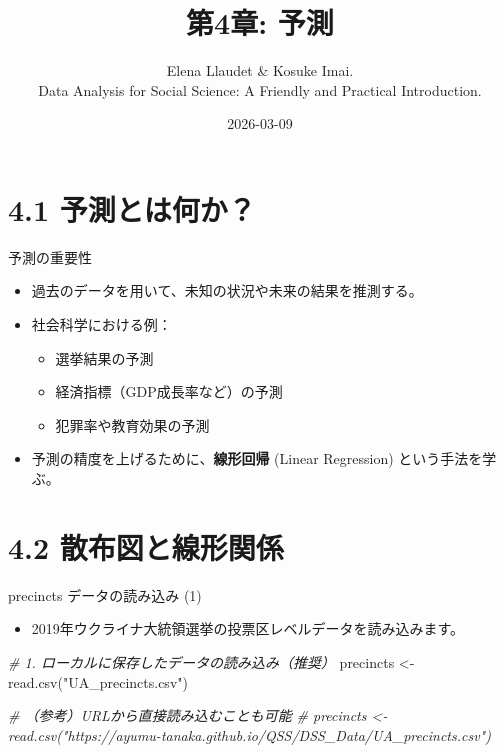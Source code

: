 \documentclass[
  ignorenonframetext,
]{beamer}
\title{第4章: 予測}
\subtitle{Elena Llaudet \& Kosuke Imai.\\
Data Analysis for Social Science: A Friendly and Practical
Introduction.}
\author{}
\date{\vspace{-2.5em}2026-03-09}
\newenvironment{Shaded}{\begin{snugshade}}{\end{snugshade}}
\newcommand{\CommentTok}[1]{\textcolor[rgb]{0.56,0.35,0.01}{\textit{#1}}}
\newcommand{\FunctionTok}[1]{\textcolor[rgb]{0.00,0.00,0.00}{#1}}
\newcommand{\NormalTok}[1]{#1}
\newcommand{\OtherTok}[1]{\textcolor[rgb]{0.56,0.35,0.01}{#1}}
\newcommand{\StringTok}[1]{\textcolor[rgb]{0.31,0.60,0.02}{#1}}
\providecommand{\tightlist}{%
  \setlength{\itemsep}{0pt}\setlength{\parskip}{0pt}}
\begin{document}
\frame{\titlepage}

\hypertarget{ux4e88ux6e2cux3068ux306fux4f55ux304b}{%
\section{4.1
予測とは何か？}\label{ux4e88ux6e2cux3068ux306fux4f55ux304b}}

\begin{frame}{予測の重要性}
\protect\hypertarget{ux4e88ux6e2cux306eux91cdux8981ux6027}{}
\begin{itemize}
\tightlist
\item
  過去のデータを用いて、未知の状況や未来の結果を推測する。
\item
  社会科学における例：

  \begin{itemize}
  \tightlist
  \item
    選挙結果の予測
  \item
    経済指標（GDP成長率など）の予測
  \item
    犯罪率や教育効果の予測
  \end{itemize}
\item
  予測の精度を上げるために、\textbf{線形回帰} (Linear Regression)
  という手法を学ぶ。
\end{itemize}
\end{frame}

\hypertarget{ux6563ux5e03ux56f3ux3068ux7ddaux5f62ux95a2ux4fc2}{%
\section{4.2
散布図と線形関係}\label{ux6563ux5e03ux56f3ux3068ux7ddaux5f62ux95a2ux4fc2}}

\begin{frame}[fragile]{precincts データの読み込み (1)}
\protect\hypertarget{precincts-ux30c7ux30fcux30bfux306eux8aadux307fux8fbcux307f-1}{}
\begin{itemize}
\tightlist
\item
  2019年ウクライナ大統領選挙の投票区レベルデータを読み込みます。
\end{itemize}

\scriptsize

\begin{Shaded}
\begin{Highlighting}[]
\CommentTok{\# 1. ローカルに保存したデータの読み込み（推奨）}
\NormalTok{precincts }\OtherTok{\textless{}{-}} \FunctionTok{read.csv}\NormalTok{(}\StringTok{"UA\_precincts.csv"}\NormalTok{)}

\CommentTok{\# （参考）URLから直接読み込むことも可能}
\CommentTok{\# precincts \textless{}{-} read.csv("https://ayumu{-}tanaka.github.io/QSS/DSS\_Data/UA\_precincts.csv")}
\end{Highlighting}
\end{Shaded}

\normalsize
\end{frame}
\end{document}
